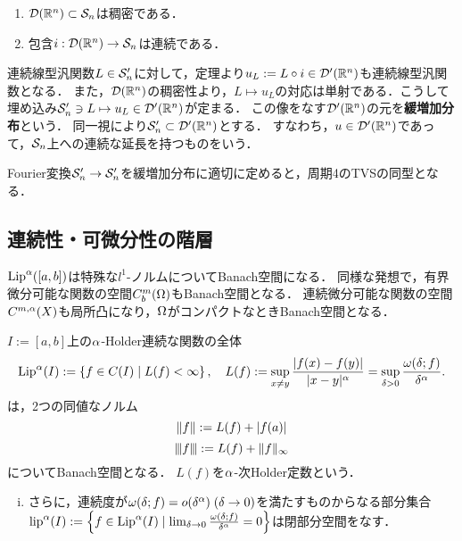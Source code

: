 \documentclass[uplatex,dvipdfmx]{jsreport}
\begin{document}
\begin{theorem}\mbox{}
    \begin{enumerate}
        \item $\D(\R^n)\subset\S_n$は稠密である．
        \item 包含$i:\D(\R^n)\to\S_n$は連続である．
    \end{enumerate}
\end{theorem}

\begin{definition}
    連続線型汎関数$L\in\S_n'$に対して，定理より$u_L:=L\circ i\in\D'(\R^n)$も連続線型汎関数となる．
    また，$\D(\R^n)$の稠密性より，$L\mapsto u_L$の対応は単射である．こうして埋め込み$\S'_n\ni L\mapsto u_L\in\D'(\R^n)$が定まる．
    この像をなす$\D'(\R^n)$の元を\textbf{緩増加分布}という．
    同一視により$\S'_n\subset\D'(\R^n)$とする．
    すなわち，$u\in\D'(\R^n)$であって，$\S_n$上への連続な延長を持つものをいう．
\end{definition}

\begin{theorem}
    Fourier変換$\S_n'\to\S_n'$を緩増加分布に適切に定めると，周期4のTVSの同型となる．
\end{theorem}

\subsection{連続性・可微分性の階層}

\begin{tcolorbox}[colframe=ForestGreen, colback=ForestGreen!10!white,breakable,colbacktitle=ForestGreen!40!white,coltitle=black,fonttitle=\bfseries\sffamily,
title=]
    $\Lip^\al([a,b])$は特殊な$l^1$-ノルムについてBanach空間になる．
    同様な発想で，有界微分可能な関数の空間$C_b^m(\Om)$もBanach空間となる．
    連続微分可能な関数の空間$C^{m,\al}(X)$も局所凸になり，$\Om$がコンパクトなときBanach空間となる．
\end{tcolorbox}

\begin{example}[Lipschitz連続な関数の空間]
    $I:=[a,b]$上の$\al$-Holder連続な関数の全体
    \[\Lip^\al(I):=\Brace{f\in C(I)\mid L(f)<\infty},\quad L(f):=\sup_{x\ne y}\frac{\abs{f(x)-f(y)}}{\abs{x-y}^\al}=\sup_{\delta>0}\frac{\om(\delta;f)}{\delta^\al}.\]
    は，2つの同値なノルム
    \[\norm{f}:=L(f)+\abs{f(a)}\]
    \[\nnorm{f}:=L(f)+\norm{f}_\infty\]
    についてBanach空間となる．
    $L(f)$を$\al$-次Holder定数という．
    \begin{enumerate}[(i)]
        \item さらに，連続度が$\om(\delta;f)=o(\delta^\al)\;(\delta\to0)$を満たすものからなる部分集合$\lip^\al(I):=\Brace{f\in\Lip^\al(I)\mid\lim_{\delta\to0}\frac{\om(\delta;f)}{\delta^\al}=0}$は閉部分空間をなす．
    \end{enumerate}
\end{example}
\end{document}
